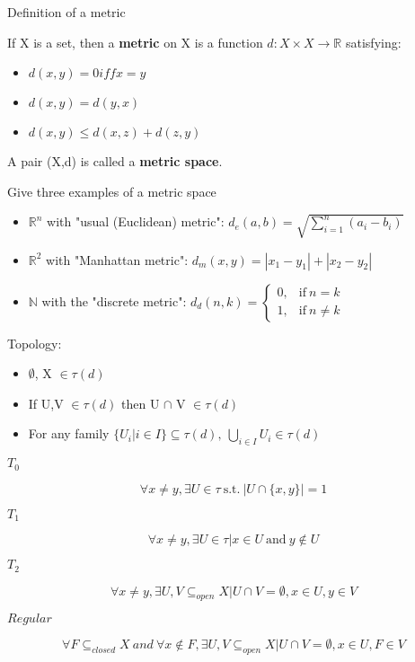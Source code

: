 \documentclass[12pt]{article}
\newcommand{\R}{\mathbb{R}}
\newcommand{\N}{\mathbb{N}}
\providecommand{\st}{\ \text{s.t.}\ }
\begin{document}
\begin{centering}
  Definition of a metric\\
\end{centering}
If X is a set, then a \textbf{metric} on X is a function $d:X\times X \rightarrow \R$ satisfying:
\begin{itemize}
  \item $d(x,y) = 0 iff x=y$
  \item $d(x,y) = d(y,x)$
  \item $d(x,y) \leq d(x,z) + d(z,y)$
\end{itemize}
A pair (X,d) is called a \textbf{metric space}.\par\medskip

Give three examples of a metric space
\begin{itemize}
  \item $\R^n$ with "usual (Euclidean) metric": $d_e(a,b) = \sqrt{\sum_{i=1}^n (a_i - b_i)}$
  \item $\R^2$ with "Manhattan metric": $d_m(x,y) = |x_1 - y_1| + |x_2 - y_2|$
  \item $\N$ with the "discrete metric": $d_d(n,k) = \begin{cases}
      0, & \text{if}\ n=k \\
      1, & \text{if}\ n \neq k
    \end{cases}$
\end{itemize}


Topology:
\begin{itemize}
  \item $\emptyset$, X $\in \tau(d)$
  \item If U,V $\in \tau(d)$ then U $\cap$ V $\in \tau(d)$
  \item For any family $\{U_i | i \in I \} \subseteq \tau(d), \ \bigcup\limits_{i\in I} U_i \in \tau(d)$
\end{itemize}


$T_0$\par
$$ \forall x \neq y, \exists U \in \tau \st |U\cap \{x,y\}|=1$$

$T_1$\par
$$ \forall x \neq y, \exists U \in \tau | x\in U \ \text{and}\  y \notin U$$


$T_2$\par
$$ \forall x \neq y, \exists U,V \subseteq_{open}X | U \cap V = \emptyset, x \in U, y \in V$$

$Regular$\par
$$ \forall F \subseteq_{closed}X\ and \ \forall x \notin F, \exists U,V \subseteq_{open}X | U \cap V = \emptyset, x \in U, F \in V$$
\end{document}
